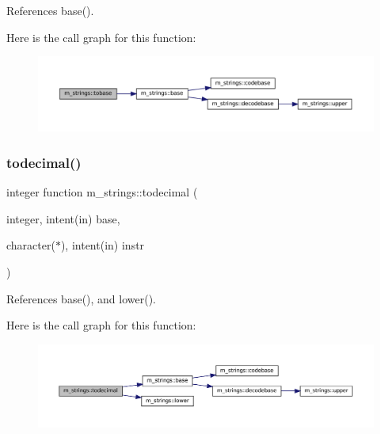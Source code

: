 References base().

Here is the call graph for this function\+:\nopagebreak
\begin{figure}[H]
\begin{center}
\leavevmode
\includegraphics[width=350pt]{namespacem__strings_aa896d221112afb3dbc90eeca6075b282_cgraph}
\end{center}
\end{figure}
\mbox{\label{namespacem__strings_aded6e43ae13ff21d76c1739f01a40a63}} 
\subsubsection{\texorpdfstring{todecimal()}{todecimal()}}
{\footnotesize\ttfamily integer function m\+\_\+strings\+::todecimal (\begin{DoxyParamCaption}\item[{integer, intent(in)}]{base,  }\item[{character($\ast$), intent(in)}]{instr }\end{DoxyParamCaption})\hspace{0.3cm}{\ttfamily [private]}}



References base(), and lower().

Here is the call graph for this function\+:\nopagebreak
\begin{figure}[H]
\begin{center}
\leavevmode
\includegraphics[width=350pt]{namespacem__strings_aded6e43ae13ff21d76c1739f01a40a63_cgraph}
\end{center}
\end{figure}
\mbox{\label{namespacem__strings_aaee428861205782e002f5e7e8fb002f0}} 
